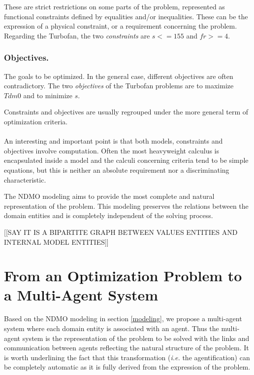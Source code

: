 These are strict restrictions on some parts of the problem, represented as functional constraints defined by equalities and/or inequalities. These can be the expression of a physical constraint, or a requirement concerning the problem.
Regarding the Turbofan, the two \emph{constraints} are $s <= 155$ and $fr >=4$.

\subsubsection*{Objectives.}

The goals to be optimized. In the general case, different objectives are often contradictory.
The two \emph{objectives} of the Turbofan problems are to maximize $Tdm0$ and to minimize $s$.

Constraints and objectives are usually regrouped under the more general term of optimization criteria. 

\paragraph*{}
An interesting and important point is that both models, constraints and objectives involve computation. Often the most heavyweight calculus is encapsulated inside a model and the calculi concerning criteria tend to be simple equations, but this is neither an absolute requirement nor a discriminating characteristic.

The NDMO modeling aims to provide the most complete and natural representation of the problem. This modeling preserves the relations between the domain entities and is completely independent of the solving process. 

[[SAY IT IS A BIPARTITE GRAPH BETWEEN VALUES ENTITIES AND INTERNAL MODEL ENTITIES]]

\section{From an Optimization Problem to a Multi-Agent System}

Based on the NDMO modeling in section \ref{modeling}, we propose a multi-agent system where each domain entity is associated with an agent. Thus the multi-agent system is the representation of the problem to be solved with the links and communication between agents reflecting the natural structure of the problem. It is worth underlining the fact that this transformation (\textit{i.e.} the agentification) can be completely automatic as it is fully derived from the expression of the problem.

